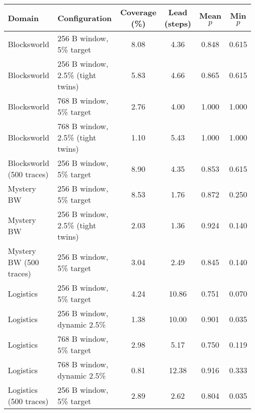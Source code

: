 \begin{tabular}{llcccc}
\toprule
Domain & Configuration & Coverage (\%) & Lead (steps) & Mean $p$ & Min $p$ \\
\midrule
Blocksworld & 256 B window, 5\% target & 8.08 & 4.36 & 0.848 & 0.615 \\
Blocksworld & 256 B window, 2.5\% (tight twins) & 5.83 & 4.66 & 0.865 & 0.615 \\
Blocksworld & 768 B window, 5\% target & 2.76 & 4.00 & 1.000 & 1.000 \\
Blocksworld & 768 B window, 2.5\% (tight twins) & 1.10 & 5.43 & 1.000 & 1.000 \\
Blocksworld (500 traces) & 256 B window, 5\% target & 8.90 & 4.35 & 0.853 & 0.615 \\
Mystery BW & 256 B window, 5\% target & 8.53 & 1.76 & 0.872 & 0.250 \\
Mystery BW & 256 B window, 2.5\% (tight twins) & 2.03 & 1.36 & 0.924 & 0.140 \\
Mystery BW (500 traces) & 256 B window, 5\% target & 3.04 & 2.49 & 0.845 & 0.140 \\
Logistics & 256 B window, 5\% target & 4.24 & 10.86 & 0.751 & 0.070 \\
Logistics & 256 B window, dynamic 2.5\% & 1.38 & 10.00 & 0.901 & 0.035 \\
Logistics & 768 B window, 5\% target & 2.98 & 5.17 & 0.750 & 0.119 \\
Logistics & 768 B window, dynamic 2.5\% & 0.81 & 12.38 & 0.916 & 0.333 \\
Logistics (500 traces) & 256 B window, 5\% target & 2.89 & 2.62 & 0.804 & 0.035 \\
\bottomrule
\end{tabular}
